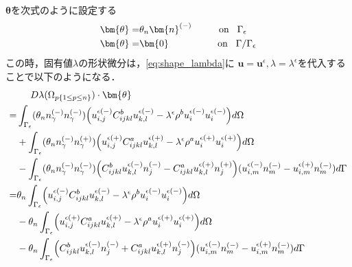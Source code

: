 $\bm{\theta}$を次式のように設定する
\begin{align}
	\bm{\theta}=&\theta_{n}\bm{n}^{(-)}	\hspace{1cm}\text{on}\hspace{0.3cm}\Gamma_{\epsilon}\\
	\bm{\theta}=&\bm{0}					\hspace{1.8cm}\text{on}\hspace{0.3cm}\Gamma/\Gamma_{\epsilon}
\end{align}
この時，固有値$\lambda$の形状微分は，\eqref{eq:shape_lambda}に
$\bm{u}=\bm{u}^{\epsilon},\lambda=\lambda^{\epsilon}$を代入することで以下のようになる．
\begin{align}
	&\hspace{0.5cm}D\lambda(\Omega_{p\{1\leq p\leq n\}})\cdot\bm{\theta}
	\nonumber
	\\
	=&\int_{\Gamma_\epsilon}(\theta_{n}n_{\gamma}^{(-)}n_{\gamma}^{(-)})
	\Bigr(u_{i,j}^{\epsilon(-)}C_{ijkl}^{b}u_{k,l}^{\epsilon(-)}
	-\lambda^{\epsilon}\rho^{b}u_{i}^{\epsilon(-)}u_{i}^{\epsilon(-)}\Bigl) d\Omega
	\nonumber
	\\
	&+\int_{\Gamma_\epsilon}(\theta_{n}n_{\gamma}^{(-)}n_{\gamma}^{(+)})
	\Bigr(u_{i,j}^{\epsilon(+)}C_{ijkl}^{a}u_{k,l}^{\epsilon(+)}
	-\lambda^{\epsilon}\rho^{a}u_{i}^{\epsilon(+)}u_{i}^{\epsilon(+)}\Bigl) d\Omega
	\nonumber
	\\
	&-\int_{\Gamma_{\epsilon}}(\theta_{n}n_{\gamma}^{(-)}n_{\gamma}^{(-)})
	\Bigr(C_{ijkl}^{b}u_{k,l}^{\epsilon(-)}n_{j}^{(-)}
	-C_{ijkl}^{a}u_{k,l}^{\epsilon(+)}n_{j}^{(+)}\Bigl)
	(u_{i,m}^{\epsilon(-)}n_{m}^{(-)}-u_{i,m}^{\epsilon(+)}n_{m}^{(-)}) d\Gamma
	\nonumber
	\\
	=&\theta_{n}\int_{\Gamma_\epsilon}
	\Bigr(u_{i,j}^{\epsilon(-)}C_{ijkl}^{b}u_{k,l}^{\epsilon(-)}
	-\lambda^{\epsilon}\rho^{b}u_{i}^{\epsilon(-)}u_{i}^{\epsilon(-)}\Bigl) d\Omega
	\nonumber
	\\
	&-\theta_{n}\int_{\Gamma_\epsilon}
	\Bigr(u_{i,j}^{\epsilon(+)}C_{ijkl}^{a}u_{k,l}^{\epsilon(+)}
	-\lambda^{\epsilon}\rho^{a}u_{i}^{\epsilon(+)}u_{i}^{\epsilon(+)}\Bigl) d\Omega
	\nonumber
	\\
	&-\theta_{n}\int_{\Gamma_{\epsilon}}
	\Bigr(C_{ijkl}^{b}u_{k,l}^{\epsilon(-)}n_{j}^{(-)}
	+C_{ijkl}^{a}u_{k,l}^{\epsilon(+)}n_{j}^{(-)}\Bigl)
	(u_{i,m}^{\epsilon(-)}n_{m}^{(-)}-u_{i,m}^{\epsilon(+)}n_{m}^{(-)}) d\Gamma
	\label{eq:SDForTD}
\end{align}

